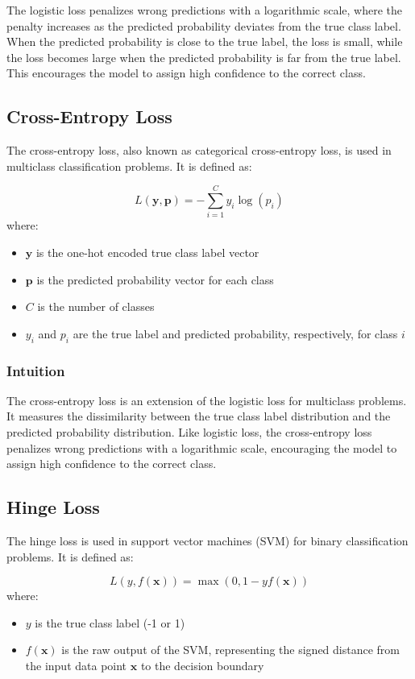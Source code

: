 \documentclass[12pt]{article}
\begin{document}
The logistic loss penalizes wrong predictions with a logarithmic scale, where the penalty increases as the predicted probability deviates from the true class label. When the predicted probability is close to the true label, the loss is small, while the loss becomes large when the predicted probability is far from the true label. This encourages the model to assign high confidence to the correct class.

\subsection{Cross-Entropy Loss}

The cross-entropy loss, also known as categorical cross-entropy loss, is used in multiclass classification problems. It is defined as:

$$L(\boldsymbol{y}, \boldsymbol{p}) = -\sum_{i=1}^{C} y_i \log(p_i)$$
where:
\begin{itemize}
\item $\boldsymbol{y}$ is the one-hot encoded true class label vector
\item $\boldsymbol{p}$ is the predicted probability vector for each class
\item $C$ is the number of classes
\item $y_i$ and $p_i$ are the true label and predicted probability, respectively, for class $i$
\end{itemize}

\subsubsection{Intuition}

The cross-entropy loss is an extension of the logistic loss for multiclass problems. It measures the dissimilarity between the true class label distribution and the predicted probability distribution. Like logistic loss, the cross-entropy loss penalizes wrong predictions with a logarithmic scale, encouraging the model to assign high confidence to the correct class.

\subsection{Hinge Loss}

The hinge loss is used in support vector machines (SVM) for binary classification problems. It is defined as:

$$L(y, f(\boldsymbol{x})) = \max(0, 1 - y f(\boldsymbol{x}))$$
where:
\begin{itemize}
\item $y$ is the true class label (-1 or 1)
\item $f(\boldsymbol{x})$ is the raw output of the SVM, representing the signed distance from the input data point $\boldsymbol{x}$ to the decision boundary
\end{itemize}
\end{document}
